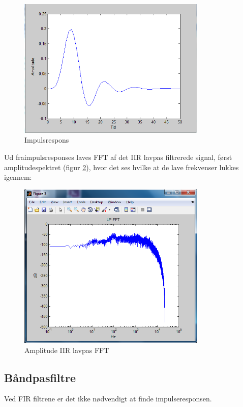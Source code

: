 \begin{figure}[h]
	\centering
	\includegraphics[width=0.8\textwidth]{Figurer/FFT_IIR}
	\caption{Impulsrespons}
	\label{Figur 5}
\end{figure}

Ud fraimpulsresponses laves FFT af det IIR lavpas filtrerede signal, først amplitudespektret (figur \ref{Figur 6}), hvor det ses hvilke at de lave frekvenser lukkes igennem:

\begin{figure}[h]
	\centering
	\includegraphics[width=0.8\textwidth]{Figurer/3_LP_FFT}
	\caption{Amplitude IIR lavpas FFT}
	\label{Figur 6}
\end{figure}

\subsection{Båndpasfiltre}
Ved FIR filtrene er det ikke nødvendigt at finde impulseresponsen.

